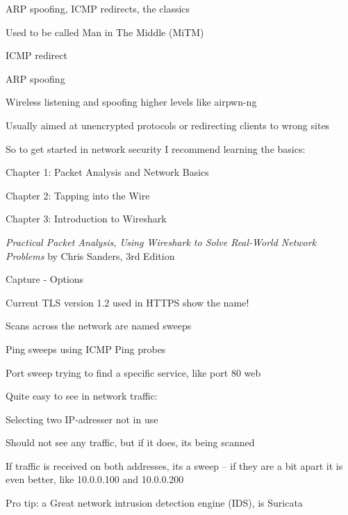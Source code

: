 \documentclass[Screen16to9,17pt]{foils}
\begin{document}

\begin{list1}
\item ARP spoofing, ICMP redirects, the classics
\item Used to be called Man in The Middle (MiTM)
\begin{list2}
\item ICMP redirect
\item ARP spoofing
\item Wireless listening and spoofing higher levels like  airpwn-ng 
\end{list2}
\item Usually aimed at unencrypted protocols or redirecting clients to wrong sites
\end{list1}



So to get started in network security I recommend learning the basics:
\begin{list2}
\item Chapter 1: Packet Analysis and Network Basics
\item Chapter 2: Tapping into the Wire
\item Chapter 3: Introduction to Wireshark
\end{list2}
\emph{Practical Packet Analysis,
Using Wireshark to Solve Real-World Network Problems}
by Chris Sanders, 3rd Edition





\centerline{Capture - Options}



\centerline{Current TLS version 1.2 used in HTTPS show the name!}




\begin{list1}
\item Scans across the network are named sweeps
\item Ping sweeps using ICMP Ping probes
\item Port sweep trying to find a specific service, like port 80 web
\item Quite easy to see in network traffic:
\begin{list2}
\item Selecting two IP-adresser not in use
\item Should not see any traffic, but if it does, its being scanned
\item If traffic is received on both addresses, its a sweep -- if they are a bit apart it is even better, like 10.0.0.100 and 10.0.0.200
  \end{list2}

\vskip 2cm
Pro tip: a Great network intrusion detection engine (IDS), is Suricata 
\end{list1}
\end{document}
